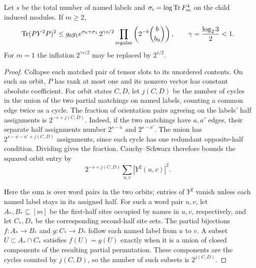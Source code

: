 \begin{lemma}\label{rec:alphabet-cycle-inflation}
Let $s$ be the total number of named labels and
$\sigma_i=\log\operatorname{Tr} F_m^4$ on the child induced modules.  If $m\ge2$,
\begin{equation}\label{rec:alphabet-pair-trace}
 \operatorname{Tr}(PY^2P)^2\le
 g_0g_1e^{\sigma_0+\sigma_1}\,
 2^{\gamma s/2}\prod_{\mathrm{regular}}
                  \left(2^{-b}\binom b{b_0}\right),
 \qquad\gamma=\frac{\log_2 3}{2}<1.
\end{equation}
For $m=1$ the inflation $2^{\gamma s/2}$ may be replaced by $2^{s/2}$.
\end{lemma}
\begin{proof}
Collapse each matched pair of tensor slots to its unordered contents.
On such an orbit, $P$ has rank at most one and its nonzero vector has
constant absolute coefficient.  For orbit states $C,D$, let $j(C,D)$
be the number of cycles in the union of the two partial matchings on
named labels, counting a common edge twice as a cycle.  The fraction
of orientation pairs agreeing on the labels' half assignments is
$2^{-s+j(C,D)}$.  Indeed, if the two matchings have $a,a'$ edges,
their separate half assignments number $2^{s-a}$ and $2^{s-a'}$.
The union has $2^{s-a-a'+j(C,D)}$ assignments, since each cycle
has one redundant opposite-half condition.  Dividing gives the
fraction.  Cauchy--Schwarz
therefore bounds the squared orbit entry by
\begin{equation}\label{rec:alphabet-orbit-entry}
 2^{-s+j(C,D)}\sum_{u,v}|Y^2(u,v)|^2.
\end{equation}

Here the sum is over word pairs in the two orbits; entries of $Y^2$
vanish unless each named label stays in its assigned half.  For such
a word pair $u,v$, let $A_*,B_*\subseteq[m]$ be the first-half sites
occupied by names in $u,v$, respectively, and let $C_*,D_*$ be the
corresponding second-half site sets.  The partial bijections
$f:A_*\to B_*$ and $g:C_*\to D_*$ follow each named label from
$u$ to $v$.  A subset $U\subset A_*\cap C_*$ satisfies $f(U)=g(U)$
exactly when it is a union of closed components of the resulting
partial permutation.  These components are the cycles counted by
$j(C,D)$, so the number of such subsets is $2^{j(C,D)}$.


\end{proof}
